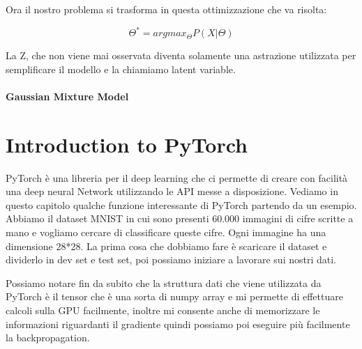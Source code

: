 \documentclass[14pt]{extreport}
\begin{document}
Ora il nostro problema si trasforma in questa ottimizzazione che va risolta:

$$\Theta^{*} = argmax_{\Theta} P(X | \Theta)$$

La Z, che non viene mai osservata diventa solamente una astrazione utilizzata per semplificare il modello e la chiamiamo latent variable.

\subsubsection{Gaussian Mixture Model}










































\chapter{Introduction to PyTorch}

PyTorch è una libreria per il deep learning che ci permette di creare con facilità una deep neural Network
utilizzando le API messe a disposizione.
Vediamo in questo capitolo qualche funzione interessante di PyTorch partendo da un esempio.
Abbiamo il dataset MNIST in cui sono presenti 60.000 immagini di cifre scritte a mano e vogliamo cercare di 
classificare queste cifre. Ogni immagine ha una dimensione 28*28.
La prima cosa che dobbiamo fare è scaricare il dataset e dividerlo in dev set e test set, poi possiamo 
iniziare a lavorare sui nostri dati.

Possiamo notare fin da subito che la struttura dati che viene utilizzata da PyTorch è il tensor che è una sorta
di numpy array e mi permette di effettuare calcoli sulla GPU facilmente, inoltre mi consente anche di memorizzare
le informazioni riguardanti il gradiente quindi possiamo poi eseguire più facilmente la backpropagation.
\end{document}
